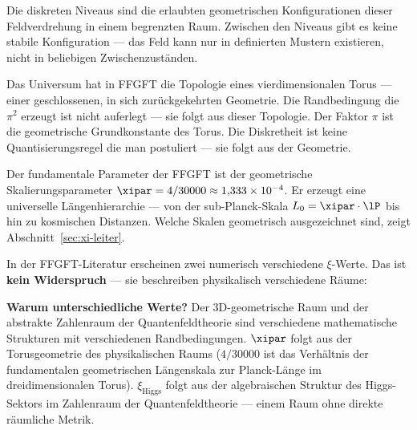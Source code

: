Die diskreten Niveaus sind die erlaubten geometrischen
Konfigurationen dieser Feldverdrehung in einem begrenzten Raum.
Zwischen den Niveaus gibt es keine stabile Konfiguration ---
das Feld kann nur in definierten Mustern existieren,
nicht in beliebigen Zwischenzuständen.

\begin{foundation}
Das Universum hat in FFGFT die Topologie eines vierdimensionalen Torus ---
einer geschlossenen, in sich zurückgekehrten Geometrie.
Die Randbedingung die $\pi^2$ erzeugt ist nicht auferlegt ---
sie folgt aus dieser Topologie. Der Faktor $\pi$ ist die
geometrische Grundkonstante des Torus. Die Diskretheit ist
keine Quantisierungsregel die man postuliert --- sie folgt
aus der Geometrie.

Der fundamentale Parameter der FFGFT ist der geometrische
Skalierungsparameter $\xipar = 4/30000 \approx 1{,}333 \times 10^{-4}$.
Er erzeugt eine universelle Längenhierarchie --- von der
sub-Planck-Skala $L_0 = \xipar \cdot \lP$ bis hin zu kosmischen Distanzen.
Welche Skalen geometrisch ausgezeichnet sind, zeigt
Abschnitt~\ref{sec:xi-leiter}.

\begin{keypoint}
In der FFGFT-Literatur erscheinen zwei numerisch verschiedene $\xi$-Werte.
Das ist \textbf{kein Widerspruch} --- sie beschreiben physikalisch verschiedene Räume:

\begin{center}
\end{center}

\textbf{Warum unterschiedliche Werte?}
Der 3D-geometrische Raum und der abstrakte Zahlenraum der
Quantenfeldtheorie sind verschiedene mathematische Strukturen
mit verschiedenen Randbedingungen.
$\xipar$ folgt aus der Torusgeometrie des physikalischen Raums
($4/30000$ ist das Verhältnis der fundamentalen geometrischen Längenskala
zur Planck-Länge im dreidimensionalen Torus).
$\xi_\text{Higgs}$ folgt aus der algebraischen Struktur des Higgs-Sektors
im Zahlenraum der Quantenfeldtheorie ---
einem Raum ohne direkte räumliche Metrik.


\end{keypoint}
\end{foundation}
